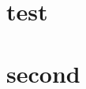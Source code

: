 \documentclass{article}
\begin{document}
\begin{multicols}{3}
\section{test}
\lipsum[1]
\columnbreak
\section{second}

\lipsum[1]

\end{multicols}
\end{document}

